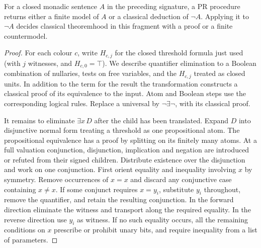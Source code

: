 \begin{theorem}\label{thm:monadiccert}
For a closed monadic sentence $A$ in the preceding signature, a PR procedure returns either a finite model of $A$ or a classical deduction of $\neg A$. Applying it to $\neg A$ decides classical theoremhood in this fragment with a proof or a finite countermodel.
\end{theorem}
\begin{proof}
For each colour $c$, write $H_{c,j}$ for the closed threshold formula just used (with $j$ witnesses, and $H_{c,0}=\top$). We describe quantifier elimination to a Boolean combination of nullaries, tests on free variables, and the $H_{c,j}$ treated as closed units. In addition to the term for the result the transformation constructs a classical proof of its equivalence to the input. Atom and Boolean steps use the corresponding logical rules. Replace a universal by $\neg\exists\neg$, with its classical proof.

It remains to eliminate $\exists x\,D$ after the child has been translated. Expand $D$ into disjunctive normal form treating a threshold as one propositional atom. The propositional equivalence has a proof by splitting on its finitely many atoms. At a full valuation conjunction, disjunction, implication and negation are introduced or refuted from their signed children. Distribute existence over the disjunction and work on one conjunction. First orient equality and inequality involving $x$ by symmetry. Remove occurrences of $x=x$ and discard any conjunctive case containing $x\ne x$. If some conjunct requires $x=y_i$, substitute $y_i$ throughout, remove the quantifier, and retain the resulting conjunction. In the forward direction eliminate the witness and transport along the required equality. In the reverse direction use $y_i$ as witness. If no such equality occurs, all the remaining conditions on $x$ prescribe or prohibit unary bits, and require inequality from a list of parameters.


\end{proof}
